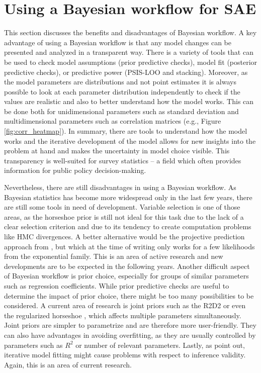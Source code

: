 \section{Using a Bayesian workflow for SAE}

This section discusses the benefits and disadvantages of Bayesian workflow.
A key advantage of using a Bayesian workflow is that any model changes can be presented and analyzed in a transparent way.
There is a variety of tools that can be used to check model assumptions (prior predictive checks), model fit (posterior predictive checks), or predictive power (PSIS-LOO and stacking).
Moreover, as the model parameters are distributions and not point estimates it is always possible to look at each parameter distribution independently to check if the values are realistic and also to better understand how the model works.
This can be done both for unidimensional parameters such as standard deviation and multidimensional parameters such as correlation matrices (e.g., Figure \ref{fig:corr_heatmap}).
In summary, there are tools to understand how the model works and the iterative development of the model allows for new insights into the problem at hand and makes the uncertainty in model choice visible.
This transparency is well-suited for survey statistics – a field which often provides information for public policy decision-making.

Nevertheless, there are still disadvantages in using a Bayesian workflow.
As Bayesian statistics has become more widespread only in the last few years, there are still some tools in need of development.
Variable selection is one of those areas, as the horseshoe prior is still not ideal for this task due to the lack of a clear selection criterion and due to its tendency to create computation problems like HMC divergences.
A better alternative would be the projective prediction approach from \cite{piironen_projective_2020}, but which at the time of writing only works for a few likelihoods from the exponential family.
This is an area of active research and new developments are to be expected in the following years.
Another difficult aspect of Bayesian workflow is prior choice, especially for groups of similar parameters such as regression coefficients.
While prior predictive checks are useful to determine the impact of prior choice, there might be too many possibilities to be considered.
A current area of research is joint priors such as the R2D2 \citep{zhang_bayesian_2020} or even the regularized horseshoe \citep{piironen_sparsity_2017}, which affects multiple parameters simultaneously.
Joint priors are simpler to parametrize and are therefore more user-friendly.
They can also have advantages in avoiding overfitting, as they are usually controlled by parameters such as $R^2$ or number of relevant parameters.
Lastly, as \cite{gelman_bayesian_2020} point out, iterative model fitting might cause problems with respect to inference validity.
Again, this is an area of current research.

